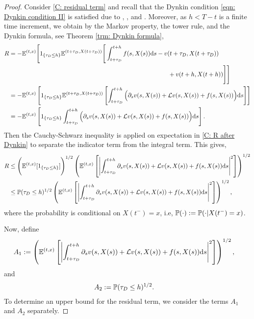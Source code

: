 \begin{proof}
    Consider \eqref{C: residual term} and recall that the Dynkin condition \eqref{eqn: Dynkin condition II} is satisfied due to , , and . Moreover, as $h<T-t$ is a finite time increment, we obtain by the Markov property, the tower rule, and the Dynkin formula, see Theorem \ref{trm: Dynkin formula}, 
    \begin{align}
        R &= -\mathbb{E}^{(t,x)} \Bigg[1_{\left\{\tau_D \leq h\right\}} \mathbb{E}^{(t+\tau_D,X(t+\tau_D))} \Bigg[ \int_{t+\tau_D}^{t+h} f(s,X(s)) \mathrm{d} s - v(t+\tau_D, X(t+\tau_D)) \nonumber \\
        & \qquad \qquad \qquad \qquad  \qquad \qquad  \qquad \qquad  \qquad \qquad  \qquad \qquad  \qquad + v(t+h,X(t+h)) \Bigg] \Bigg] \nonumber\\
        &= -\mathbb{E}^{(t,x)} \left[1_{\left\{\tau_D \leq h\right\}} \mathbb{E}^{(t+\tau_D,X(t+\tau_D))} \left[ \int_{t+\tau_D}^{t+h} \Big(\partial_sv(s,X(s)) +\mathcal{L} v(s,X(s)) + f(s,X(s)) \Big) \mathrm{d} s\right] \right] \nonumber\\
        &= -\mathbb{E}^{(t,x)} \left[1_{\left\{\tau_D \leq h\right\}} \int_{t+\tau_D}^{t+h} \Big(\partial_sv(s,X(s)) +\mathcal{L} v(s,X(s)) + f(s,X(s)) \Big) \mathrm{d} s \right].
        \label{C: R after Dynkin}
    \end{align}
    Then the Cauchy-Schwarz inequality is applied on expectation in \eqref{C: R after Dynkin} to separate the indicator term from the  integral term. This gives,
    \begin{align}
        R &\leq \Bigg(\mathbb{E}^{(t,x)} [1_{\left\{\tau_D \leq h\right\}}]\Bigg)^{1/2} \left(\mathbb{E}^{(t,x)} \left[ \left| \int_{t+\tau_D}^{t+h} \partial_s v(s, X(s)) + \mathcal{L} v(s,X(s)) + f(s,X(s)) \mathrm{d} s \right|^2 \right]\right)^{1/2}
        \nonumber \\
        &\leq \mathbb{P} (\tau_D \leq h)^{1/2} \left(\mathbb{E}^{(t,x)} \left[ \left| \int_{t+\tau_D}^{t+h} \partial_s v(s, X(s)) + \mathcal{L} v(s,X(s)) + f(s,X(s)) \mathrm{d} s \right|^2 \right]\right)^{1/2}, \label{eqn: R inequality}
    \end{align}
    where the probability is conditional on $X(t^-)=x$, i.e, $\mathbb{P}(\cdot):= \mathbb{P} (\cdot | X(t^-)=x)$. 

    Now, define 
    \begin{align*}
        A_1 &:= \left(\mathbb{E}^{(t,x)} \left[ \left| \int_{t+\tau_D}^{t+h} \partial_s v(s, X(s)) + \mathcal{L} v(s,X(s)) + f(s,X(s)) \mathrm{d} s \right|^2 \right]\right)^{1/2}, 
    \end{align*}
    and
    \begin{align*}
        A_2 &:= \mathbb{P} (\tau_D \leq h)^{1/2}.
    \end{align*}
    To determine an upper bound for the residual term, we consider the terms $A_1$ and $A_2$ separately. 


\end{proof}
